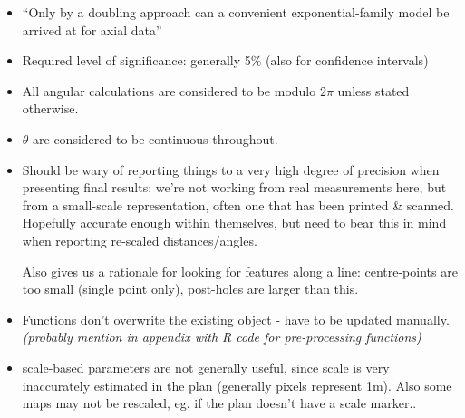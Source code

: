 \documentclass[12pt,fleqn]{article}
\numberwithin{equation}{section}
\begin{document}
\begin{itemize}
\item 
``Only by a doubling approach can a convenient exponential-family model be arrived at for axial data'' \cite{Arnold2011}

\item
Required level of significance: generally 5\% (also for confidence intervals)

\item
All angular calculations are considered to be modulo $2\pi$ unless stated otherwise.

\item
$\theta$ are considered to be continuous throughout.

\item
Should be wary of reporting things to a very high degree of precision when presenting final results: we're not working from real measurements here, but from a small-scale representation, often one that has been printed \& scanned. Hopefully accurate enough within themselves, but need to bear this in mind when reporting re-scaled distances/angles.

Also gives us a rationale for looking for features along a line: centre-points are too small (single point only), post-holes are larger than this.

\item
Functions don't overwrite the existing object - have to be updated manually.
\textit{(probably mention in appendix with R code for pre-processing functions)
}

\item
scale-based parameters are not generally useful, since scale is very inaccurately estimated in the plan (generally  pixels represent 1m). Also some maps may not be rescaled, eg. if the plan doesn't have a scale marker..

\end{itemize}
\newpage



\newpage
\tableofcontents


\newpage


\newpage


\newpage


\newpage


\newpage
\end{document}
